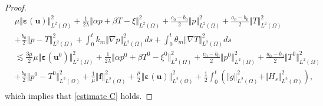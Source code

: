 \documentclass{article}
\newtheorem{lemma}{Lemma}[section]
\numberwithin{equation}{section}
\begin{document}
\begin{proof}
  \begin{equation}    
\begin{aligned} 
& \mu \Vert\bm\varepsilon(\bm u)\Vert_{L^2(\Omega)}^2  
  +\frac1{2\lambda} \Vert\alpha p+\beta T-\xi\Vert_{L^2(\Omega)}^2
  +\frac{c_0-b_0}{2} \Vert p\Vert_{L^2(\Omega)}^2  
 +\frac{a_0-b_0}{2} \Vert T\Vert_{L^2(\Omega)}^2 \\
&+\frac{b_0}{2} \Vert p-T\Vert_{L^2(\Omega)}^2  
+ \int_0^t k_m\Vert\nabla p\Vert_{L^2(\Omega)}^2ds
 +\int_0^t \theta_m\Vert\nabla T\Vert_{L^2(\Omega)}^2ds\\
&\lesssim \frac{3\mu}{2} \mu \Vert\bm\varepsilon(\bm u^0)\Vert_{L^2(\Omega)}^2  
  +\frac1{2\lambda} \Vert\alpha p^0+\beta T^0-\xi^0\Vert_{L^2(\Omega)}^2
  +\frac{c_0-b_0}{2} \Vert p^0\Vert_{L^2(\Omega)}^2  
 +\frac{a_0-b_0}{2} \Vert T^0\Vert_{L^2(\Omega)}^2 \\
&+\frac{b_0}{2} \Vert p^0-T^0\Vert_{L^2(\Omega)}^2   
 + \frac1{\mu} \Vert \bm f\Vert_{L^2(\Omega)}^2
  +\frac\mu{2} \Vert\bm\varepsilon(\bm u)\Vert_{L^2(\Omega)}^2  
  + \frac12\int_0^t(\Vert g\Vert_{L^2(\Omega)}^2+\Vert  H_{s}\Vert_{L^2(\Omega)}^2) ,\\
\end{aligned}
\end{equation}
 which implies that \eqref{estimate C} holds.
\end{proof}




 
\end{document}
